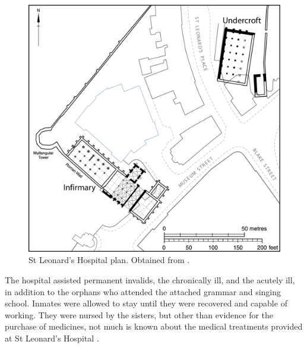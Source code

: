 \documentclass[%
	]{ijsra}
\begin{document}
 	\begin{figure}
 		\includegraphics[width=\linewidth]{figures/Pereda-Figure01}
 		\caption{St Leonard’s Hospital plan. Obtained from \textcite[Figure 37][100]{Dean_2008}.}
 		\label{fig:Perada-Figure01}
 	\end{figure}
 
 The hospital assisted permanent invalids, the chronically ill, and the acutely ill, in addition to the orphans who attended the attached grammar and singing school. Inmates were allowed to stay until they were recovered and capable of working. They were nursed by the sisters, but other than evidence for the purchase of medicines, not much is known about the medical treatments provided at St Leonard’s Hospital \parencites[5,12-15]{Cullum_1991}[21]{Dainton_1961}[97]{Dean_2008}[134]{Goldberg_1992}{Page_1974}[78,109]{Palliser_2014}.
 
\end{document}
